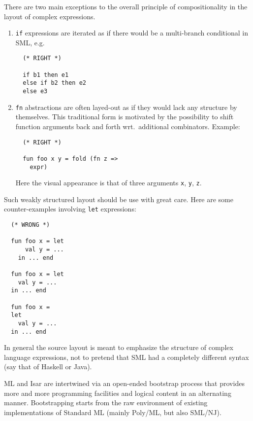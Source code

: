 \begin{isabellebody}
\begin{isamarkuptext}
  \medskip There are two main exceptions to the overall principle of
  compositionality in the layout of complex expressions.

  \begin{enumerate}

  \item \verb|if| expressions are iterated as if there would be
  a multi-branch conditional in SML, e.g.

  \begin{verbatim}
  (* RIGHT *)

  if b1 then e1
  else if b2 then e2
  else e3
  \end{verbatim}

  \item \verb|fn| abstractions are often layed-out as if they
  would lack any structure by themselves.  This traditional form is
  motivated by the possibility to shift function arguments back and
  forth wrt.\ additional combinators.  Example:

  \begin{verbatim}
  (* RIGHT *)

  fun foo x y = fold (fn z =>
    expr)
  \end{verbatim}

  Here the visual appearance is that of three arguments \verb|x|,
  \verb|y|, \verb|z|.

  \end{enumerate}

  Such weakly structured layout should be use with great care.  Here
  are some counter-examples involving \verb|let| expressions:

  \begin{verbatim}
  (* WRONG *)

  fun foo x = let
      val y = ...
    in ... end

  fun foo x = let
    val y = ...
  in ... end

  fun foo x =
  let
    val y = ...
  in ... end
  \end{verbatim}

  \medskip In general the source layout is meant to emphasize the
  structure of complex language expressions, not to pretend that SML
  had a completely different syntax (say that of Haskell or Java).%
\end{isamarkuptext}%
\isamarkuptrue%
%
\isamarkuptrue%
%
\begin{isamarkuptext}%
ML and Isar are intertwined via an open-ended bootstrap
  process that provides more and more programming facilities and
  logical content in an alternating manner.  Bootstrapping starts from
  the raw environment of existing implementations of Standard ML
  (mainly Poly/ML, but also SML/NJ).


\end{isamarkuptext}
\end{isabellebody}
